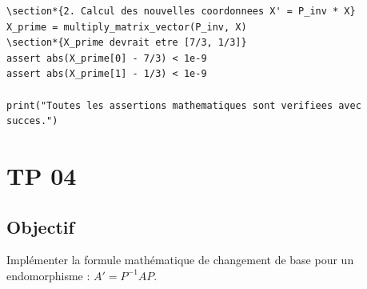 \documentclass{report}
\begin{document}
\begin{verbatim}
\section*{2. Calcul des nouvelles coordonnees X' = P_inv * X}
X_prime = multiply_matrix_vector(P_inv, X)
\section*{X_prime devrait etre [7/3, 1/3]}
assert abs(X_prime[0] - 7/3) < 1e-9
assert abs(X_prime[1] - 1/3) < 1e-9

print("Toutes les assertions mathematiques sont verifiees avec succes.")
\end{verbatim}


\section*{TP 04}
\subsection*{Objectif}
Implémenter la formule mathématique de changement de base pour un endomorphisme : $A' = P^{-1} A P$.
\end{document}
